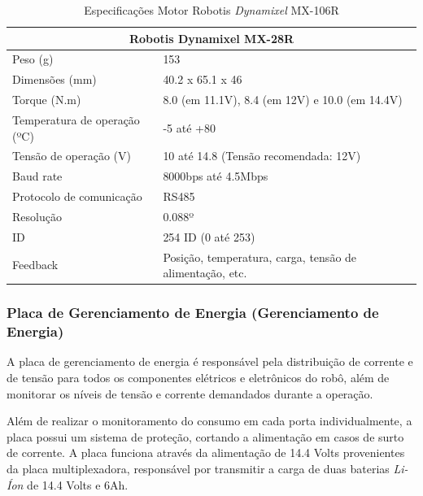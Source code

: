 \begin{table}[h!]
	\begin{tabular}{ll}
	
		\multicolumn{2}{c}{Robotis Dynamixel MX-28R}                                            \\ \hline
		Peso (g)                     & 153                                                      \\ \hline
		Dimensões (mm)               & 40.2 x 65.1 x 46                                         \\ \hline
		Torque (N.m)                 & 8.0 (em 11.1V), 8.4 (em 12V) e 10.0 (em 14.4V)           \\ \hline
		Temperatura de operação (ºC) & -5 até +80                                               \\ \hline
		Tensão de operação (V)       & 10 até 14.8 (Tensão recomendada: 12V)                    \\ \hline
		Baud rate                    & 8000bps até 4.5Mbps                                      \\ \hline
		Protocolo de comunicação     & RS485                                                    \\ \hline
		Resolução                    & 0.088º                                                   \\ \hline
		ID                           & 254 ID (0 até 253)                                       \\ \hline
		Feedback                     & Posição, temperatura, carga, tensão de alimentação, etc. \\ \hline
	\end{tabular}
	\caption{Especificações Motor Robotis\textit{ Dynamixel} MX-106R  }
\end{table}

\pagebreak
\subsubsection{Placa de Gerenciamento de Energia (Gerenciamento de Energia)}
A placa de gerenciamento de energia é responsável pela distribuição de corrente e de tensão para todos os componentes elétricos e eletrônicos do robô, além de monitorar os níveis de tensão e corrente demandados durante a operação. 

Além de realizar o monitoramento do consumo em cada porta individualmente, a placa possui um sistema de proteção, cortando a alimentação em casos de surto de corrente. A placa funciona através da alimentação de 14.4 Volts provenientes da placa multiplexadora, responsável por transmitir a carga de duas baterias \textit{Li-Íon} de 14.4 Volts e 6Ah.

